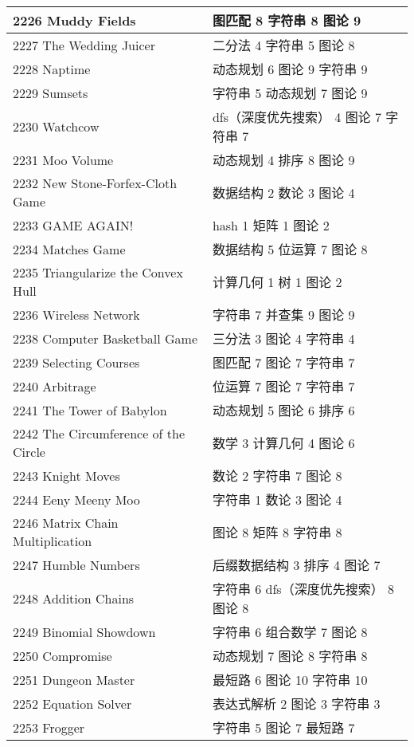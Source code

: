 \begin{longtable}{| p{} | p{} |}
 2226 Muddy Fields  & 图匹配 8 字符串 8 图论 9 \\ \hline
 2227 The Wedding Juicer  & 二分法 4 字符串 5 图论 8 \\ \hline
 2228 Naptime  & 动态规划 6 图论 9 字符串 9 \\ \hline
 2229 Sumsets  & 字符串 5 动态规划 7 图论 9 \\ \hline
 2230 Watchcow  & dfs（深度优先搜索） 4 图论 7 字符串 7 \\ \hline
 2231 Moo Volume  & 动态规划 4 排序 8 图论 9 \\ \hline
 2232 New Stone-Forfex-Cloth Game  & 数据结构 2 数论 3 图论 4 \\ \hline
 2233 GAME AGAIN!  & hash 1 矩阵 1 图论 2 \\ \hline
 2234 Matches Game  & 数据结构 5 位运算 7 图论 8 \\ \hline
 2235 Triangularize the Convex Hull  & 计算几何 1 树 1 图论 2 \\ \hline
 2236 Wireless Network  & 字符串 7 并查集 9 图论 9 \\ \hline
 2238 Computer Basketball Game  & 三分法 3 图论 4 字符串 4 \\ \hline
 2239 Selecting Courses  & 图匹配 7 图论 7 字符串 7 \\ \hline
 2240 Arbitrage  & 位运算 7 图论 7 字符串 7 \\ \hline
 2241 The Tower of Babylon  & 动态规划 5 图论 6 排序 6 \\ \hline
 2242 The Circumference of the Circle  & 数学 3 计算几何 4 图论 6 \\ \hline
 2243 Knight Moves  & 数论 2 字符串 7 图论 8 \\ \hline
 2244 Eeny Meeny Moo  & 字符串 1 数论 3 图论 4 \\ \hline
 2246 Matrix Chain Multiplication  & 图论 8 矩阵 8 字符串 8 \\ \hline
 2247 Humble Numbers  & 后缀数据结构 3 排序 4 图论 7 \\ \hline
 2248 Addition Chains  & 字符串 6 dfs（深度优先搜索） 8 图论 8 \\ \hline
 2249 Binomial Showdown  & 字符串 6 组合数学 7 图论 8 \\ \hline
 2250 Compromise  & 动态规划 7 图论 8 字符串 8 \\ \hline
 2251 Dungeon Master  & 最短路 6 图论 10 字符串 10 \\ \hline
 2252 Equation Solver  & 表达式解析 2 图论 3 字符串 3 \\ \hline
 2253 Frogger  & 字符串 5 图论 7 最短路 7 \\ \hline

\end{longtable}

